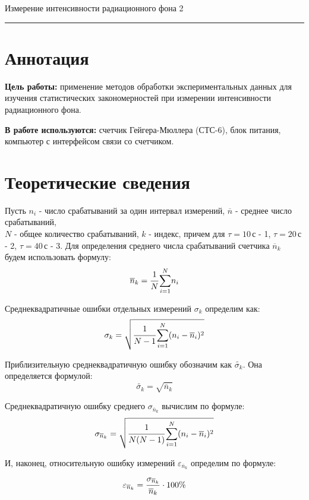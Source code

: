 \documentclass[12pt,a4paper]{scrartcl}
\begin{document}
	
	\begin{flushleft}
		\footnotesize{Измерение интенсивности радиационного фона} \hspace{\fill} \footnotesize{2}
		\\[-0.3cm]\noindent\rule{\textwidth}{0.3pt}
	\end{flushleft}

	\section{Аннотация}
	\textbf{Цель работы:} применение методов обработки экспериментальных данных для изучения статистических закономерностей при измерении интенсивности радиационного фона.
	\par\textbf{В работе используются:} счетчик Гейгера-Мюллера (СТС-6), блок питания, компьютер с интерфейсом связи со счетчиком. 
	
	\section{Теоретические сведения}
	Пусть $n_i$ - число срабатываний за один интервал измерений, $\overline{n}$ - среднее число срабатываний, \\$N$ - общее количество срабатываний, $k$ - индекс, причем для $\tau = 10\,$с - 1, $\tau = 20\,$с - 2, $\tau = 40\,$с - 3. Для определения среднего числа срабатываний счетчика $\overline{n}_k$ будем использовать формулу:
	\begin{equation}
		\overline{n}_k = \dfrac{\strut 1}{\strut N}\overset{N}{\underset{i = 1}{\sum}} n_i
	\end{equation}
	\par Среднеквадратичные ошибки отдельных измерений $\sigma_{k}$ определим как:
	\begin{equation}
		\sigma_k = \sqrt{\dfrac{\strut 1}{\strut N-1}\overset{N}{\underset{i = 1}{\sum}}(n_i - \overline{n}_i)^2}
	\end{equation}
	\par Приблизительную среднеквадратичную ошибку обозначим как $\tilde{\sigma_{k}}$. Она определяется формулой:
	\begin{equation}
		\tilde{\sigma_{k}} = \sqrt{\overline{n}_k}
	\end{equation}
	\par Среднеквадратичную ошибку среднего $\sigma_{\overline{n}_k}$ вычислим по формуле:
	\begin{equation}
		\sigma_{\overline{n}_k} = \sqrt{\dfrac{\strut 1}{\strut N(N-1)}\overset{N}{\underset{i = 1}{\sum}}(n_i - \overline{n}_i)^2}
	\end{equation}
	\par И, наконец, относительную ошибку измерений $\varepsilon_{\overline{n}_k}$ определим по формуле:
	\begin{equation}
		\varepsilon_{\overline{n}_k} = \dfrac{\strut \sigma_{\overline{n}_k}}{\strut \overline{n}_k}\cdot 100\%	
	\end{equation}
\end{document}

